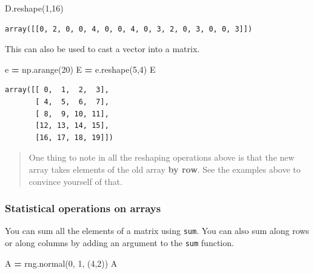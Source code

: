 \documentclass[
  letterpaper,
]{scrbook}
\newenvironment{Shaded}{\begin{snugshade}}{\end{snugshade}}
\newcommand{\DecValTok}[1]{\textcolor[rgb]{0.00,0.00,0.81}{#1}}
\newcommand{\NormalTok}[1]{#1}
\newcommand{\OperatorTok}[1]{\textcolor[rgb]{0.81,0.36,0.00}{\textbf{#1}}}
\begin{document}
\begin{Shaded}
\begin{Highlighting}[]
\NormalTok{D.reshape(}\DecValTok{1}\NormalTok{,}\DecValTok{16}\NormalTok{)}
\end{Highlighting}
\end{Shaded}

\begin{verbatim}
array([[0, 2, 0, 0, 4, 0, 0, 4, 0, 3, 2, 0, 3, 0, 0, 3]])
\end{verbatim}

This can also be used to cast a vector into a matrix.

\begin{Shaded}
\begin{Highlighting}[]
\NormalTok{e }\OperatorTok{=}\NormalTok{ np.arange(}\DecValTok{20}\NormalTok{)}
\NormalTok{E }\OperatorTok{=}\NormalTok{ e.reshape(}\DecValTok{5}\NormalTok{,}\DecValTok{4}\NormalTok{)}
\NormalTok{E}
\end{Highlighting}
\end{Shaded}

\begin{verbatim}
array([[ 0,  1,  2,  3],
       [ 4,  5,  6,  7],
       [ 8,  9, 10, 11],
       [12, 13, 14, 15],
       [16, 17, 18, 19]])
\end{verbatim}

\begin{quote}
One thing to note in all the reshaping operations above is that the new array takes elements of the old array \textbf{by row}. See the examples above to convince yourself of that.
\end{quote}

\hypertarget{statistical-operations-on-arrays}{%
\subsubsection{Statistical operations on arrays}\label{statistical-operations-on-arrays}}

You can sum all the elements of a matrix using \texttt{sum}. You can also sum along rows or along columns by adding an argument to the \texttt{sum} function.

\begin{Shaded}
\begin{Highlighting}[]
\NormalTok{A }\OperatorTok{=}\NormalTok{ rng.normal(}\DecValTok{0}\NormalTok{, }\DecValTok{1}\NormalTok{, (}\DecValTok{4}\NormalTok{,}\DecValTok{2}\NormalTok{))}
\NormalTok{A}
\end{Highlighting}
\end{Shaded}
\end{document}

